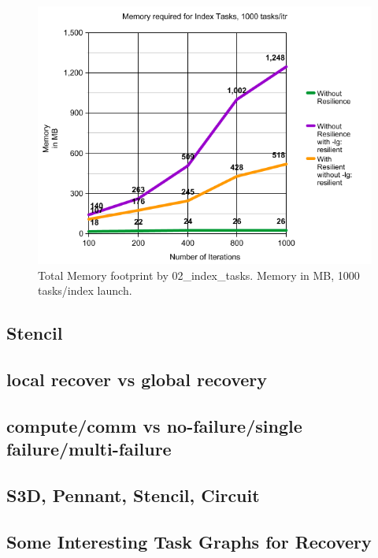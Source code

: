 \begin{figure}
\includegraphics[width=\textwidth]{images/index_tasks_memory.png}
\caption{Total Memory footprint by 02\_index\_tasks. Memory in MB, 1000 tasks/index launch.}
\end{figure}





\subsection{Stencil}



\subsection{local recover vs global recovery}

\subsection{compute/comm vs no-failure/single failure/multi-failure}

\subsection{S3D, Pennant, Stencil, Circuit}

\subsection{Some Interesting Task Graphs for Recovery}


